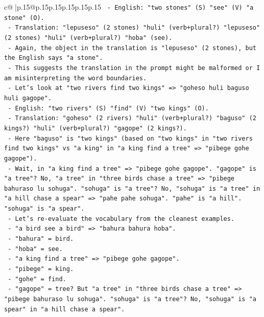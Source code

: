 \documentclass{article}
\begin{document}
{\begin{supertabular}{c@{$\;$}|p{.15\linewidth}@{}p{.15\linewidth}p{.15\linewidth}p{.15\linewidth}p{.15\linewidth}p{.15\linewidth}}
{{{\texttt{                {-} English: "two stones" (S) "see" (V) "a stone" (O).} \\
\texttt{                {-} Translation: "lepuseso" (2 stones) "huli" (verb+plural?) "lepuseso" (2 stones) "huli" (verb+plural?) "hoba" (see).} \\
\texttt{                {-} Again, the object in the translation is "lepuseso" (2 stones), but the English says "a stone".} \\
\texttt{                {-} This suggests the translation in the prompt might be malformed or I am misinterpreting the word boundaries.} \\
\texttt{                {-} Let's look at "two rivers find two kings" => "goheso huli baguso huli gagope".} \\
\texttt{                  {-} English: "two rivers" (S) "find" (V) "two kings" (O).} \\
\texttt{                  {-} Translation: "goheso" (2 rivers) "huli" (verb+plural?) "baguso" (2 kings?) "huli" (verb+plural?) "gagope" (2 kings?).} \\
\texttt{                  {-} Here "baguso" is "two kings" (based on "two kings" in "two rivers find two kings" vs "a king" in "a king find a tree" => "pibege gohe gagope").} \\
\texttt{                  {-} Wait, in "a king find a tree" => "pibege gohe gagope". "gagope" is "a tree"? No, "a tree" in "three birds chase a tree" => "pibege bahuraso lu sohuga". "sohuga" is "a tree"? No, "sohuga" is "a tree" in "a hill chase a spear" => "pahe pahe sohuga". "pahe" is "a hill". "sohuga" is "a spear".} \\
\texttt{                  {-} Let's re{-}evaluate the vocabulary from the cleanest examples.} \\
\texttt{                  {-} "a bird see a bird" => "bahura bahura hoba".} \\
\texttt{                    {-} "bahura" = bird.} \\
\texttt{                    {-} "hoba" = see.} \\
\texttt{                  {-} "a king find a tree" => "pibege gohe gagope".} \\
\texttt{                    {-} "pibege" = king.} \\
\texttt{                    {-} "gohe" = find.} \\
\texttt{                    {-} "gagope" = tree? But "a tree" in "three birds chase a tree" => "pibege bahuraso lu sohuga". "sohuga" is "a tree"? No, "sohuga" is "a spear" in "a hill chase a spear".} \\
}}}
\end{supertabular}}
\end{document}
